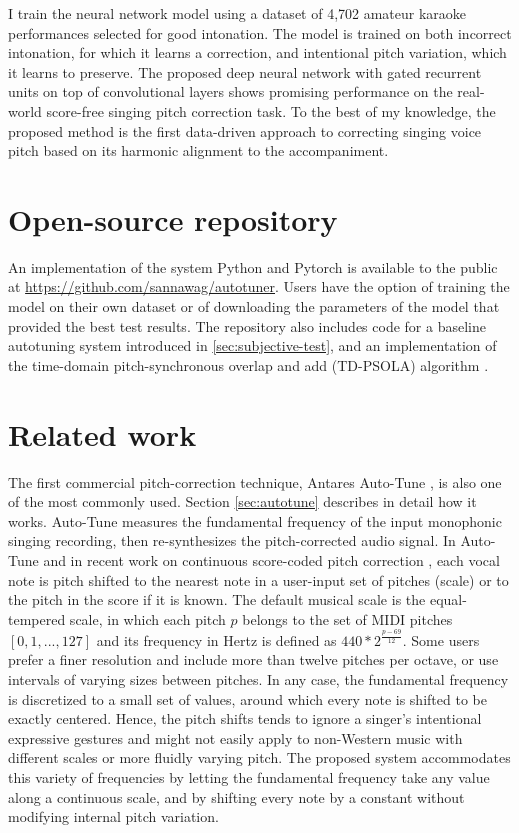 I train the neural network model using a dataset of 4,702 amateur karaoke performances selected for good intonation. The model is trained on both incorrect intonation, for which it learns a correction, and intentional pitch variation, which it learns to preserve. The proposed deep neural network with gated recurrent units on top of convolutional layers shows promising performance on the real-world score-free singing pitch correction task. To the best of my knowledge, the proposed method is the first data-driven approach to correcting singing voice pitch based on its harmonic alignment to the accompaniment.

\section{Open-source repository}
An implementation of the system Python and Pytorch is available to the public at \href{https://github.com/sannawag/autotuner}{https://github.com/sannawag/autotuner}. Users have the option of training the model on their own dataset or of downloading the parameters of the model that provided the best test results. The repository also includes code for a baseline autotuning system introduced in \ref{sec:subjective-test}, and an implementation of the time-domain pitch-synchronous overlap and add (TD-PSOLA) algorithm \cite{charpentier1986diphone}.

\section{Related work}
The first commercial pitch-correction technique, Antares Auto-Tune \cite{antares:2016}, is also one of the most commonly used. Section \ref{sec:autotune} describes in detail how it works. Auto-Tune measures the fundamental frequency of the input monophonic singing recording, then re-synthesizes the pitch-corrected audio signal. In Auto-Tune and in recent work on continuous score-coded pitch correction \cite{salazar2015continuous}, each vocal note is pitch shifted to the nearest note in a user-input set of pitches (scale) or to the pitch in the score if it is known. The default musical scale is the equal-tempered scale, in which each pitch $p$ belongs to the set of MIDI pitches $[0, 1, ..., 127]$ and its frequency in Hertz is defined as $440*2^{\frac{p-69}{12}}$. Some users prefer a finer resolution and include more than twelve pitches per octave, or use intervals of varying sizes between pitches. In any case, the fundamental frequency is discretized to a small set of values, around which every note is shifted to be exactly centered. Hence, the pitch shifts tends to ignore a singer's intentional expressive gestures and might not easily apply to non-Western music with different scales or more fluidly varying pitch. The proposed system accommodates this variety of frequencies by letting the fundamental frequency take any value along a continuous scale, and by shifting every note by a constant without modifying internal pitch variation.

